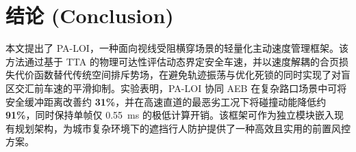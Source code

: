 \documentclass[conference]{IEEEtran}
\begin{document}
\section{结论 (Conclusion)}

本文提出了 PA-LOI，一种面向视线受阻横穿场景的轻量化主动速度管理框架。该方法通过基于 TTA 的物理可达性评估动态界定安全车速，并以速度解耦的合页损失代价函数替代传统空间排斥势场，在避免轨迹振荡与优化死锁的同时实现了对盲区交汇前车速的平滑抑制。实验表明，PA-LOI 协同 AEB 在复杂路口场景中可将安全缓冲距离改善约 \textbf{31\%}，并在高速直道的最恶劣工况下将碰撞动能降低约 \textbf{91\%}，同时保持单帧仅 \SI{0.55}{\milli\second} 的极低计算开销。该框架可作为独立模块嵌入现有规划架构，为城市复杂环境下的遮挡行人防护提供了一种高效且实用的前置风控方案。



\end{document}
